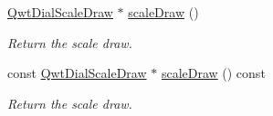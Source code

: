 \begin{DoxyCompactItemize}
\item 
\hyperlink{class_qwt_dial_scale_draw}{Qwt\-Dial\-Scale\-Draw} $\ast$ \hyperlink{class_qwt_dial_a4e51987ef0800ddbd36a0923535a2cdd}{scale\-Draw} ()
\begin{DoxyCompactList}\small\item\em Return the scale draw. \end{DoxyCompactList}\item 
const \hyperlink{class_qwt_dial_scale_draw}{Qwt\-Dial\-Scale\-Draw} $\ast$ \hyperlink{class_qwt_dial_aad0c63b60e30da5cb8430951a4c78404}{scale\-Draw} () const 
\begin{DoxyCompactList}\small\item\em Return the scale draw. \end{DoxyCompactList}\end{DoxyCompactItemize}
